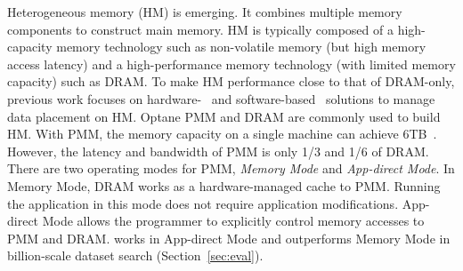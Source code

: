 Heterogeneous memory (HM) is emerging. It combines multiple memory components to construct main memory. HM is typically composed of a high-capacity memory technology such as non-volatile memory (but high memory access latency) and a high-performance memory technology (with limited memory capacity) such as DRAM. 
To make HM performance close to that of DRAM-only, previous work focuses on hardware-~\cite{asplos15:agarwal,hetero_mem_arch,qureshi_micro09, ibm_isca09,gpu_pcm_pact13} and software-based~\cite{eurosys16:dulloor,asplos16:lin,wen:ICS18,sc18:wu,unimem:sc17,luo:NGS,cluster20:ren} solutions to manage data placement on HM. Optane PMM and DRAM are commonly used to build HM. With PMM, the memory capacity on a single machine can achieve 6TB~\cite{optane:ucsd}. However, the latency and bandwidth of PMM is only 1/3 and 1/6 of DRAM. There are two operating modes for PMM, \textit{Memory Mode} and \textit{App-direct Mode}. 
In Memory Mode, DRAM works as a hardware-managed cache to PMM. Running the application in this mode does not require application modifications. App-direct Mode allows the programmer to explicitly control memory accesses to PMM and DRAM. \name works in App-direct Mode and outperforms Memory Mode in billion-scale dataset search (Section~\ref{sec:eval}). 